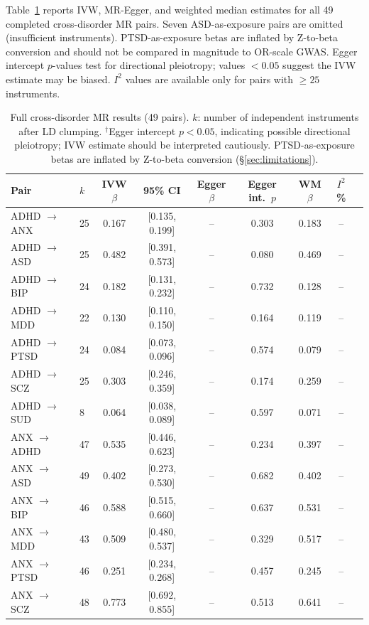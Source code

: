 \documentclass[11pt]{article}
\begin{document}
Table~\ref{tab:mr_full} reports IVW, MR-Egger, and weighted median estimates for all 49 completed cross-disorder MR pairs. Seven ASD-as-exposure pairs are omitted (insufficient instruments). PTSD-as-exposure betas are inflated by Z-to-beta conversion and should not be compared in magnitude to OR-scale GWAS. Egger intercept $p$-values test for directional pleiotropy; values $< 0.05$ suggest the IVW estimate may be biased. $I^2$ values are available only for pairs with $\geq 25$ instruments.

\begin{table}[h]
\centering
\caption{Full cross-disorder MR results (49 pairs). $k$: number of independent instruments after LD clumping. $^{\dagger}$Egger intercept $p < 0.05$, indicating possible directional pleiotropy; IVW estimate should be interpreted cautiously. PTSD-as-exposure betas are inflated by Z-to-beta conversion (\S\ref{sec:limitations}).}
\label{tab:mr_full}
\footnotesize
\begin{tabular}{llccccccc}
\toprule
Pair & $k$ & IVW $\beta$ & 95\% CI & Egger $\beta$ & Egger int.\ $p$ & WM $\beta$ & $I^2$\% \\
\midrule
ADHD $\to$ ANX & 25 & 0.167 & [0.135, 0.199] & -- & 0.303 & 0.183 & -- \\
ADHD $\to$ ASD & 25 & 0.482 & [0.391, 0.573] & -- & 0.080 & 0.469 & -- \\
ADHD $\to$ BIP & 24 & 0.182 & [0.131, 0.232] & -- & 0.732 & 0.128 & -- \\
ADHD $\to$ MDD & 22 & 0.130 & [0.110, 0.150] & -- & 0.164 & 0.119 & -- \\
ADHD $\to$ PTSD & 24 & 0.084 & [0.073, 0.096] & -- & 0.574 & 0.079 & -- \\
ADHD $\to$ SCZ & 25 & 0.303 & [0.246, 0.359] & -- & 0.174 & 0.259 & -- \\
ADHD $\to$ SUD & 8 & 0.064 & [0.038, 0.089] & -- & 0.597 & 0.071 & -- \\
\midrule
ANX $\to$ ADHD & 47 & 0.535 & [0.446, 0.623] & -- & 0.234 & 0.397 & -- \\
ANX $\to$ ASD & 49 & 0.402 & [0.273, 0.530] & -- & 0.682 & 0.402 & -- \\
ANX $\to$ BIP & 46 & 0.588 & [0.515, 0.660] & -- & 0.637 & 0.531 & -- \\
ANX $\to$ MDD & 43 & 0.509 & [0.480, 0.537] & -- & 0.329 & 0.517 & -- \\
ANX $\to$ PTSD & 46 & 0.251 & [0.234, 0.268] & -- & 0.457 & 0.245 & -- \\
ANX $\to$ SCZ & 48 & 0.773 & [0.692, 0.855] & -- & 0.513 & 0.641 & -- \\

\end{tabular}
\end{table}
\end{document}
